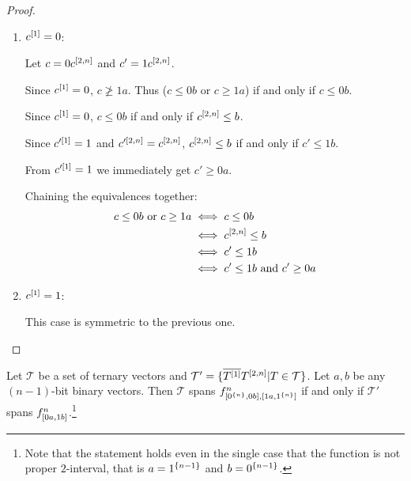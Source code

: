\begin{proof}
\hfill %
\begin{enumerate}
\item $c^{[1]} = 0$:

Let $c = 0 c^{[2, n]}$ and $c' = 1 c^{[2, n]}$.

Since $c^{[1]} = 0$,
$c \ngeq 1 a$.
Thus ($c \leq 0 b$ or $c \geq 1 a$)
if and only if
$c \leq 0 b$.

Since $c^{[1]} = 0$,
$c \leq 0 b$
if and only if
$c^{[2, n]} \leq b$.

Since $c'^{[1]} = 1$
and $c'^{[2, n]} = c^{[2, n]}$,
$c^{[2, n]} \leq b$
if and only if
$c' \leq 1 b$.

From $c'^{[1]} = 1$ we immediately get $c' \geq 0 a$.

Chaining the equivalences together:
\begin{align*}
c \leq 0 b \text{ or }c \geq 1 a
&\iff c \leq 0 b \\
&\iff c^{[2, n]} \leq b \\
&\iff c' \leq 1 b \\
&\iff c' \leq 1 b \text{ and } c' \geq 0 a
\end{align*}

\item $c^{[1]} = 1$:

This case is symmetric to the previous one.

\end{enumerate}
\end{proof}

\begin{lemma}
\label{lemma:tflip}
Let $\mathcal{T}$ be a set of ternary vectors
and $\mathcal{T}'
= \{\overline{T^{[1]}} T^{[2, n]}
|T \in \mathcal{T}\}$.
Let $a, b$ be any $(n-1)$-bit binary vectors.
Then $\mathcal{T}$ spans $f^{n}_{[0^{\{n\}}, 0 b], [1 a, 1^{\{n\}}]}$
if and only if
$\mathcal{T}'$ spans
$f^{n}_{[0 a, 1 b]}$.\footnote{Note that
the statement holds even in the single case that
the function is not proper $2$-interval,
that is $a = 1^{\{n-1\}}$ and $b = 0^{\{n-1\}}$.}
\end{lemma}

